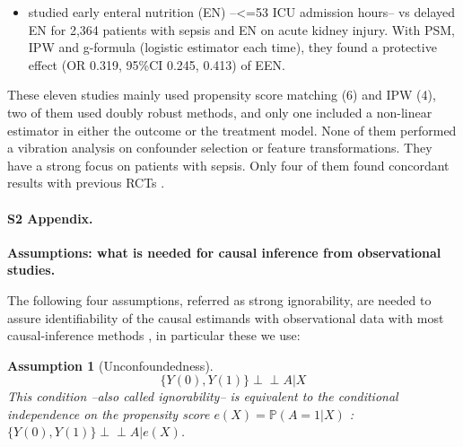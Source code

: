 \documentclass[10pt,letterpaper]{article}
\newcommand{\indep}{\perp \!\!\! \perp}
\newtheorem{assumption}{Assumption}
\begin{document}
\begin{itemize}[leftmargin=2ex]
          found a non-significant trend
          in favor of albumin used for severe sepsis patients and a significant
          reduction for septic shock patients, both on 90-day mortality. These
          results are aligned with \cite{caironi2014albumin} that found no effect
          for severe sepsis patient but positive effect for septic shock patients.
    \item \cite{wang2023early} studied \textcolor{I}{early enteral nutrition (EN)
              --<=53 ICU admission hours--} vs \textcolor{C}{delayed EN} for
          \textcolor{P}{2,364 patients with sepsis and EN} on
          \textcolor{O}{acute kidney injury}. With PSM, IPW and g-formula
          (logistic estimator each time), they found a protective effect
          (OR 0.319, 95\%CI 0.245, 0.413) of EEN.
\end{itemize}

These eleven studies mainly used propensity score matching (6) and IPW (4), two of
them used doubly robust methods, and only one included a non-linear estimator in
either the outcome or the treatment model. None of them performed a vibration
analysis on confounder selection or feature transformations. They have a
strong focus on patients with sepsis. Only four of them found concordant results with
previous RCTs \cite{liu2021effects,shahn2020fluid,adibuzzaman2019323}.


\paragraph*{S2 Appendix.}
\label{apd:causal_assumptions}
{\bf Assumptions: what is needed for causal inference from observational studies.}


The following four assumptions, referred as strong ignorability, are
needed to assure identifiability of the causal estimands with observational
data with most causal-inference methods \cite{rubin2005causal}, in
particular these we use:

\begin{assumption}[Unconfoundedness]\label{assumption:ignorability}
    \begin{equation}\label{eq:ignorability}
        \{Y(0), Y(1) \} \indep A | X
    \end{equation}
    This condition --also called ignorability-- is equivalent to the conditional
    independence on the propensity score $e(X)=\mathbb P(A=1|X)$ \cite{rosenbaum1983central}: $\{Y(0), Y(1) \}\indep  A | e(X)$.
\end{assumption}
\end{document}
